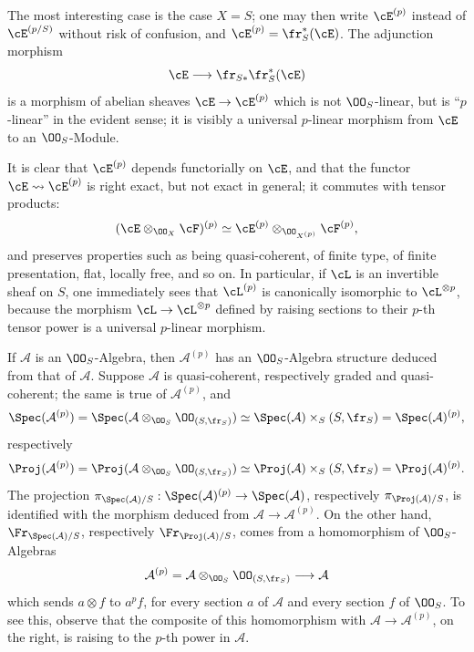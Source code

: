 The most interesting case is the case $X=S$; one may then write $\cE^{(p)}$ instead of $\cE^{(p/S)}$ without risk of confusion, and $\cE^{(p)}=\fr_S^*(\cE)$. The adjunction morphism
\[
\cE\longrightarrow \fr_{S*}\fr_S^*(\cE)
\]
is a morphism of abelian sheaves $\cE\to\cE^{(p)}$ which is not $\OO_S$-linear, but is ``$p$-linear'' in the evident sense; it is visibly a universal $p$-linear morphism from $\cE$ to an $\OO_S$-Module.

It is clear that $\cE^{(p)}$ depends functorially on $\cE$, and that the functor $\cE\rightsquigarrow\cE^{(p)}$ is right exact, but not exact in general; it commutes with tensor products:
\[
(\cE\otimes_{\OO_X}\cF)^{(p)}\simeq
\cE^{(p)}\otimes_{\OO_{X^{(p)}}}\cF^{(p)},
\]
and preserves properties such as being quasi-coherent, of finite type, of finite presentation, flat, locally free, and so on. In particular, if $\cL$ is an invertible sheaf on $S$, one immediately sees that $\cL^{(p)}$ is canonically isomorphic to $\cL^{\otimes p}$, because the morphism $\cL\to\cL^{\otimes p}$ defined by raising sections to their $p$-th tensor power is a universal $p$-linear morphism.

If $\mathcal{A}$ is an $\OO_S$-Algebra, then $\mathcal{A}^{(p)}$ has an $\OO_S$-Algebra structure deduced from that of $\mathcal{A}$. Suppose $\mathcal{A}$ is quasi-coherent, respectively graded and quasi-coherent; the same is true of $\mathcal{A}^{(p)}$, and
\[
\Spec(\mathcal{A}^{(p)})=\Spec(\mathcal{A}\otimes_{\OO_S}\OO_{(S,\fr_S)})
 \simeq \Spec(\mathcal{A})\times_S(S,\fr_S)=\Spec(\mathcal{A})^{(p)},
\]
respectively
\[
\Proj(\mathcal{A}^{(p)})=\Proj(\mathcal{A}\otimes_{\OO_S}\OO_{(S,\fr_S)})
 \simeq \Proj(\mathcal{A})\times_S(S,\fr_S)=\Proj(\mathcal{A})^{(p)}.
\]
The projection $\pi_{\Spec(\mathcal{A})/S}:\Spec(\mathcal{A})^{(p)}\to\Spec(\mathcal{A})$, respectively $\pi_{\Proj(\mathcal{A})/S}$, is identified with the morphism deduced from $\mathcal{A}\to\mathcal{A}^{(p)}$. On the other hand, $\Fr_{\Spec(\mathcal{A})/S}$, respectively $\Fr_{\Proj(\mathcal{A})/S}$, comes from a homomorphism of $\OO_S$-Algebras
\[
\mathcal{A}^{(p)}=\mathcal{A}\otimes_{\OO_S}\OO_{(S,\fr_S)}\longrightarrow \mathcal{A}
\]
which sends $a\otimes f$ to $a^p f$, for every section $a$ of $\mathcal{A}$ and every section $f$ of $\OO_S$. To see this, observe that the composite of this homomorphism with $\mathcal{A}\to\mathcal{A}^{(p)}$, on the right, is raising to the $p$-th power in $\mathcal{A}$.

